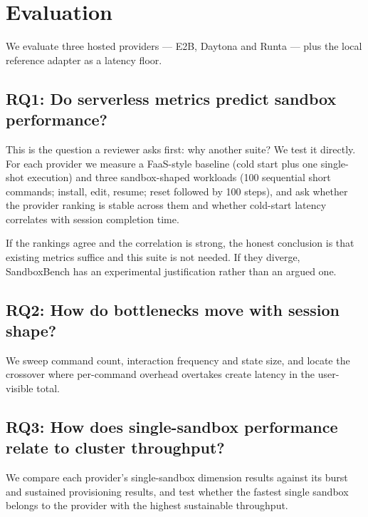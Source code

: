 \section{Evaluation}
\label{sec:evaluation}


We evaluate three hosted providers --- E2B, Daytona and Runta --- plus the
local reference adapter as a latency floor.

\subsection*{RQ1: Do serverless metrics predict sandbox performance?}

This is the question a reviewer asks first: why another suite? We test it
directly. For each provider we measure a FaaS-style baseline (cold start plus
one single-shot execution) and three sandbox-shaped workloads (100 sequential
short commands; install, edit, resume; reset followed by 100 steps), and ask
whether the provider ranking is stable across them and whether cold-start
latency correlates with session completion time.

If the rankings agree and the correlation is strong, the honest conclusion is
that existing metrics suffice and this suite is not needed. If they diverge,
SandboxBench has an experimental justification rather than an argued one.

\subsection*{RQ2: How do bottlenecks move with session shape?}

We sweep command count, interaction frequency and state size, and locate the
crossover where per-command overhead overtakes create latency in the
user-visible total.

\subsection*{RQ3: How does single-sandbox performance relate to cluster throughput?}

We compare each provider's single-sandbox dimension results against its burst
and sustained provisioning results, and test whether the fastest single
sandbox belongs to the provider with the highest sustainable throughput.

